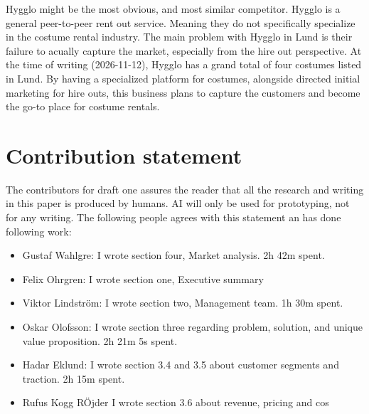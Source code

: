\documentclass[a4paper, titlepage]{article}
\begin{document}
Hygglo might be the most obvious, and most similar competitor. Hygglo is a general peer-to-peer rent out service. Meaning they do not specifically specialize in the costume rental industry. The main problem with Hygglo in Lund is their failure to acually capture the market, especially from the hire out perspective. At the time of writing (2026-11-12), Hygglo has a grand total of four costumes listed in Lund. By having a specialized platform for costumes, alongside directed initial marketing for hire outs, this business plans to capture the customers and become the go-to place for costume rentals. 

\newpage

\printbibliography[heading=bibintoc]

\appendixpage

\section*{Contribution statement}
The contributors for draft one assures the reader that all the research and writing in this paper is produced by humans. AI will only be used for prototyping, not for any writing. The following people agrees with this statement an has done following work:

\begin{itemize}
    \item Gustaf Wahlgre: I wrote section four, Market analysis. 2h 42m spent.
    \item Felix Ohrgren: I wrote section one, Executive summary
    \item Viktor Lindström: I wrote section two, Management team. 1h 30m spent.
    \item Oskar Olofsson: I wrote section three regarding problem, solution, and unique value proposition. 2h 21m 5s spent.
    \item Hadar Eklund: I wrote section 3.4 and 3.5 about customer segments and traction. 2h 15m spent.
    \item Rufus Kogg RÖjder I wrote section 3.6 about revenue, pricing and cos
\end{itemize}
\end{document}

